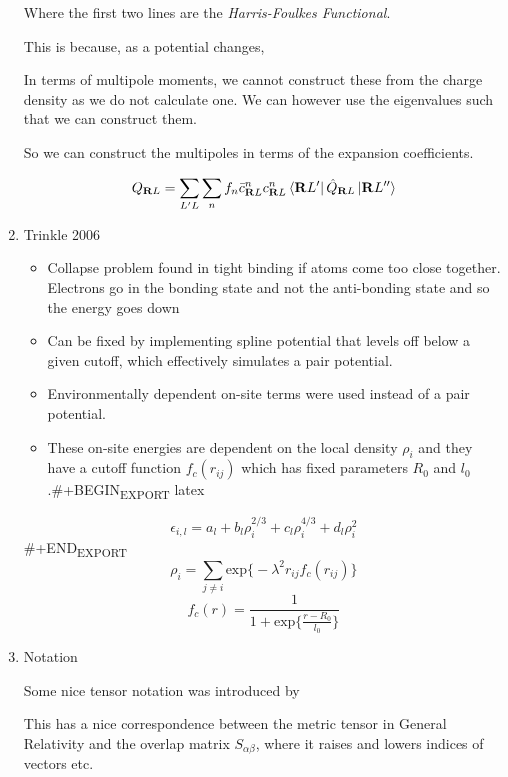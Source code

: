 \documentclass[11pt]{article}
\begin{document}
\begin{enumerate}
Where the first two lines are the \emph{Harris-Foulkes Functional}.

This is because, as a potential changes, 

In terms of multipole moments, we cannot construct these from the charge density as we do not calculate one. 
We can however use the eigenvalues such that we can construct them. 

So we can construct the multipoles in terms of the expansion coefficients. 



\begin{equation}
Q_{\mathbf{R}L} = \sum_{L'L} \sum_{n}  f_{n} \bar{c}_{\mathbf{R}L}^{n} c_{\mathbf{R}L}^{n} 
                        \bra{\mathbf{R}L'}\hat{Q}_{\mathbf{R}L}\ket{\mathbf{R}L''}
\end{equation}


\item Trinkle 2006
\label{sec:orgc060de5}
\begin{itemize}
\item Collapse problem found in tight binding if atoms come too close
together. Electrons go in the bonding state and not the anti-bonding
state and so the energy goes down
\item Can be fixed by implementing spline potential that levels off below a
given cutoff, which effectively simulates a pair potential.
\item Environmentally dependent on-site terms were used instead of a pair potential.
\item These on-site energies are dependent on the local density \(\rho_{i}\) and
they have a cutoff function \(f_{c}(r_{ij})\) which has fixed parameters
\(R_{0}\) and \(l_{0}\).\#+BEGIN\textsubscript{EXPORT} latex
\end{itemize}
\begin{equation}
      \epsilon_{i,l} = a_{l} + b_{l}\rho_{i}^{2/3} + c_{l}\rho_{i}^{4/3} +
      d_{l}\rho_{i}^{2}\end{equation}
\#+END\textsubscript{EXPORT} 
      \[ \rho_{i} = \sum_{j \neq i} \text{exp}\big\{ -\lambda^{2} r_{ij}
      f_{c}(r_{ij}) \big\} \]
      \[ f_{c}(r) = \frac{1}{1 + \text{exp}\Big\{  \frac{r-R_{0}}{l_{0}}\Big\}
      }\]

\item Notation
\label{sec:org7c1e5b5}

Some nice tensor notation was introduced by \cite{Ballentine1986}

This has a nice correspondence between the metric tensor in General Relativity
and the overlap matrix \(S_{\alpha\beta}\), where it raises and lowers indices
of vectors etc.
\end{enumerate}
\end{document}
